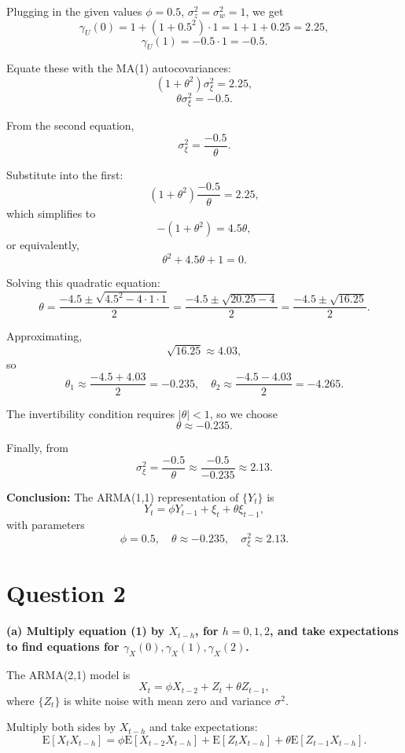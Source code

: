 \documentclass{article}
\begin{document}
Plugging in the given values \(\phi = 0.5\), \(\sigma_z^2 = \sigma_w^2 = 1\), we get
\[
\gamma_U(0) = 1 + (1 + 0.5^2) \cdot 1 = 1 + 1 + 0.25 = 2.25,
\]
\[
\gamma_U(1) = -0.5 \cdot 1 = -0.5.
\]

Equate these with the MA(1) autocovariances:
\[
(1 + \theta^2) \sigma_\xi^2 = 2.25,
\]
\[
\theta \sigma_\xi^2 = -0.5.
\]

From the second equation,
\[
\sigma_\xi^2 = \frac{-0.5}{\theta}.
\]

Substitute into the first:
\[
(1 + \theta^2) \frac{-0.5}{\theta} = 2.25,
\]
which simplifies to
\[
-(1 + \theta^2) = 4.5 \theta,
\]
or equivalently,
\[
\theta^2 + 4.5 \theta + 1 = 0.
\]

Solving this quadratic equation:
\[
\theta = \frac{-4.5 \pm \sqrt{4.5^2 - 4 \cdot 1 \cdot 1}}{2} = \frac{-4.5 \pm \sqrt{20.25 - 4}}{2} = \frac{-4.5 \pm \sqrt{16.25}}{2}.
\]

Approximating,
\[
\sqrt{16.25} \approx 4.03,
\]
so
\[
\theta_1 \approx \frac{-4.5 + 4.03}{2} = -0.235, \quad \theta_2 \approx \frac{-4.5 - 4.03}{2} = -4.265.
\]

The invertibility condition requires \( |\theta| < 1 \), so we choose
\[
\theta \approx -0.235.
\]

Finally, from
\[
\sigma_\xi^2 = \frac{-0.5}{\theta} \approx \frac{-0.5}{-0.235} \approx 2.13.
\]

\vspace{6pt}

\noindent \textbf{Conclusion:} The ARMA(1,1) representation of \( \{Y_t\} \) is
\[
Y_t = \phi Y_{t-1} + \xi_t + \theta \xi_{t-1},
\]
with parameters
\[
\boxed{
\phi = 0.5, \quad \theta \approx -0.235, \quad \sigma_\xi^2 \approx 2.13.
}
\]
\section{Question 2}
\textbf{(a) Multiply equation (1) by \(X_{t-h}\), for \(h=0,1,2\), and take expectations to find equations for \(\gamma_X(0), \gamma_X(1), \gamma_X(2)\).}

\medskip

The ARMA(2,1) model is
\[
X_t = \phi X_{t-2} + Z_t + \theta Z_{t-1},
\]
where \(\{Z_t\}\) is white noise with mean zero and variance \(\sigma^2\).

Multiply both sides by \(X_{t-h}\) and take expectations:
\[
\mathrm{E}[X_t X_{t-h}] = \phi \mathrm{E}[X_{t-2} X_{t-h}] + \mathrm{E}[Z_t X_{t-h}] + \theta \mathrm{E}[Z_{t-1} X_{t-h}].
\]
\end{document}
